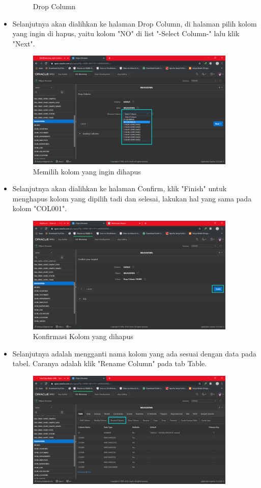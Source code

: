 \documentclass[12pt, times new roman]{article}
\begin{document}
\begin{itemize}
\begin{figure}[htbp]
	\caption{Drop Column}
\end{figure}
\item Selanjutnya akan dialihkan ke halaman Drop Column, di halaman pilih kolom yang ingin di hapus, yaitu kolom "NO" di list "-Select Column-" lalu klik "Next".
\begin{figure}[htbp]
	\centering
	\includegraphics[width=10cm]{figures/12.png}
	\caption{Memilih kolom yang ingin dihapus}
\end{figure}
\item Selanjutnya akan dialihkan ke halaman Confirm, klik "Finish" untuk menghapus kolom yang dipilih tadi dan selesai, lakukan hal yang sama pada kolom "COL001".
\begin{figure}[htbp]
	\centering
	\includegraphics[width=10cm]{figures/13.png}
	\caption{Konfirmasi Kolom yang dihapus}
\end{figure}
\item Selanjutnya adalah mengganti nama kolom yang ada sesuai dengan data pada tabel. Caranya adalah klik "Rename Column" pada tab Table.
\begin{figure}[htbp]
	\centering
	\includegraphics[width=10cm]{figures/14.png}

\end{figure}
\end{itemize}
\end{document}
